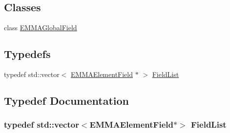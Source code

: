 \subsection*{Classes}
\begin{DoxyCompactItemize}
\item 
class \hyperlink{classEMMAGlobalField}{E\+M\+M\+A\+Global\+Field}
\end{DoxyCompactItemize}
\subsection*{Typedefs}
\begin{DoxyCompactItemize}
\item 
typedef std\+::vector$<$ \hyperlink{classEMMAElementField}{E\+M\+M\+A\+Element\+Field} $\ast$ $>$ \hyperlink{EMMAGlobalField_8hh_a40431785b28c5a3bdd4df87d5f637c5b}{Field\+List}
\end{DoxyCompactItemize}


\subsection{Typedef Documentation}
\subsubsection[{\texorpdfstring{Field\+List}{FieldList}}]{\setlength{\rightskip}{0pt plus 5cm}typedef std\+::vector$<${\bf E\+M\+M\+A\+Element\+Field}$\ast$$>$ {\bf Field\+List}}\hypertarget{EMMAGlobalField_8hh_a40431785b28c5a3bdd4df87d5f637c5b}{}\label{EMMAGlobalField_8hh_a40431785b28c5a3bdd4df87d5f637c5b}
